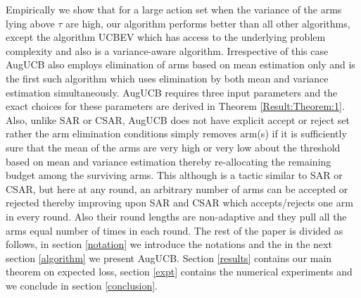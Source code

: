 Empirically we show that for a large action set when the variance of the arms lying above $\tau$ are high, our algorithm performs better than all other algorithms, except the algorithm UCBEV which has access to the underlying problem complexity and also is a variance-aware algorithm. Irrespective of this case AugUCB also employs elimination of arms based on mean estimation only and is the first such algorithm which uses elimination by both mean and variance estimation simultaneously. AugUCB requires three input parameters and the exact choices for these parameters are derived in Theorem \ref{Result:Theorem:1}. Also, unlike SAR or CSAR, AugUCB does not have explicit accept or reject set rather the arm elimination conditions simply removes arm(s) if it is sufficiently sure that the mean of the arms are very high or very low about the threshold based on mean and variance estimation thereby re-allocating the remaining budget among the surviving arms. This although is a tactic similar to SAR or CSAR, but here at any round, an arbitrary number of arms can be accepted or rejected thereby improving upon SAR and CSAR which accepts/rejects one arm in every round. Also their round lengths are non-adaptive and they pull all the arms equal number of times in each round. 
The rest of the paper is divided as follows, in section \ref{notation} we introduce the notations and the in the next section \ref{algorithm} we present AugUCB. 
Section \ref{results} contains our main theorem on expected loss, section \ref{expt} contains the numerical experiments and we conclude in section \ref{conclusion}.



  